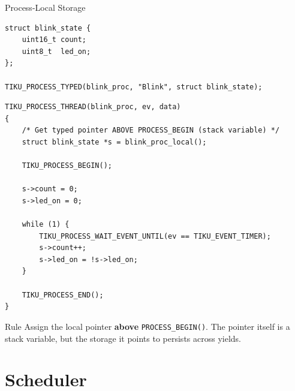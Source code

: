 \documentclass[aspectratio=169, 10pt]{beamer}
\begin{document}
\begin{frame}[fragile]{Process-Local Storage}

\begin{lstlisting}[style=cstyle, title={Declaring process with local storage}]
struct blink_state {
    uint16_t count;
    uint8_t  led_on;
};

TIKU_PROCESS_TYPED(blink_proc, "Blink", struct blink_state);
\end{lstlisting}

\begin{lstlisting}[style=cstyle, title={Using local storage inside protothread}]
TIKU_PROCESS_THREAD(blink_proc, ev, data)
{
    /* Get typed pointer ABOVE PROCESS_BEGIN (stack variable) */
    struct blink_state *s = blink_proc_local();

    TIKU_PROCESS_BEGIN();

    s->count = 0;
    s->led_on = 0;

    while (1) {
        TIKU_PROCESS_WAIT_EVENT_UNTIL(ev == TIKU_EVENT_TIMER);
        s->count++;
        s->led_on = !s->led_on;
    }

    TIKU_PROCESS_END();
}
\end{lstlisting}

\begin{alertblock}{Rule}
Assign the local pointer \textbf{above} \texttt{PROCESS\_BEGIN()}.
The pointer itself is a stack variable, but the storage it points to
persists across yields.
\end{alertblock}
\end{frame}

\section{Scheduler}
\end{document}
